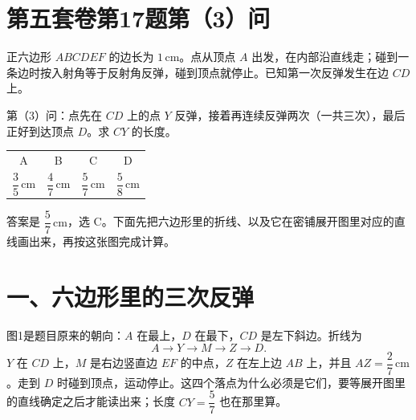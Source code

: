 \documentclass[11pt,a4paper,fontset=none]{ctexart}
\begin{document}
\section*{第五套卷\quad 第17题第（3）问}

正六边形 \(ABCDEF\) 的边长为 \(1\,\mathrm{cm}\)。点从顶点 \(A\) 出发，在内部沿直线走；碰到一条边时按入射角等于反射角反弹，碰到顶点就停止。已知第一次反弹发生在边 \(CD\) 上。

第（3）问：点先在 \(CD\) 上的点 \(Y\) 反弹，接着再连续反弹两次（一共三次），最后正好到达顶点 \(D\)。求 \(CY\) 的长度。

\begin{center}
\renewcommand{\arraystretch}{1.15}
\begin{tabular}{cccc}
A & B & C & D\\
\(\dfrac{3}{5}\,\mathrm{cm}\) &
\(\dfrac{4}{7}\,\mathrm{cm}\) &
\(\dfrac{5}{7}\,\mathrm{cm}\) &
\(\dfrac{5}{8}\,\mathrm{cm}\)
\end{tabular}
\end{center}

答案是 \(\dfrac{5}{7}\,\mathrm{cm}\)，选 C。下面先把六边形里的折线、以及它在密铺展开图里对应的直线画出来，再按这张图完成计算。

\section*{一、六边形里的三次反弹}

图1是题目原来的朝向：\(A\) 在最上，\(D\) 在最下，\(CD\) 是左下斜边。折线为
\[
  A \longrightarrow Y \longrightarrow M \longrightarrow Z \longrightarrow D.
\]
\(Y\) 在 \(CD\) 上，\(M\) 是右边竖直边 \(EF\) 的中点，\(Z\) 在左上边 \(AB\) 上，并且 \(AZ=\dfrac{2}{7}\,\mathrm{cm}\)。走到 \(D\) 时碰到顶点，运动停止。这四个落点为什么必须是它们，要等展开图里的直线确定之后才能读出来；长度 \(CY=\dfrac{5}{7}\) 也在那里算。
\end{document}
